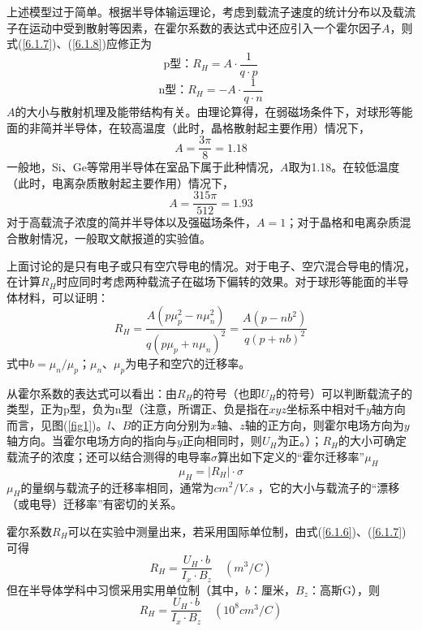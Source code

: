 \documentclass[a4paper]{article}
\begin{document}
上述模型过于简单。根据半导体输运理论，考虑到载流子速度的统计分布以及载流子在运动中受到散射等因素，在霍尔系数的表达式中还应引入一个霍尔因子$A$，则式(\ref{6.1.7})、(\ref{6.1.8})应修正为
\begin{equation}\label{6.1.9}
\text{p型：}R_H=A\cdot\frac{1}{q\cdot p}
\end{equation}
\begin{equation}\label{6.1.10}
\text{n型：}R_H=-A\cdot\frac{1}{q\cdot n}
\end{equation}
$A$的大小与散射机理及能带结构有关。由理论算得，在弱磁场条件下，对球形等能面的非简并半导体，在较高温度（此时，晶格散射起主要作用）情况下，
\begin{equation*}
A=\frac{3\pi}{8}=1.18
\end{equation*}
一般地，Si、Ge等常用半导体在室品下属于此种情况，$A$取为1.18。在较低温度（此时，电离杂质散射起主要作用）情况下，
\begin{equation*}
A=\frac{315\pi}{512}=1.93
\end{equation*}
对于高载流子浓度的简并半导体以及强磁场条件，$A=1$；对于晶格和电离杂质混合散射情况，一般取文献报道的实验值。

上面讨论的是只有电子或只有空穴导电的情况。对于电子、空穴混合导电的情况，在计算$R_H$时应同时考虑两种载流子在磁场下偏转的效果。对于球形等能面的半导体材料，可以证明：
\begin{equation}\label{6.1.11}
R_H=\frac{A(p\mu_p^2-n\mu_n^2)}{q(p\mu_p+n\mu_n)^2}=\frac{A(p-nb^2)}{q(p+nb)^2}
\end{equation}
式中$b=\mu_n/\mu_p$；$\mu_n$、$\mu_p$为电子和空穴的迁移率。

从霍尔系数的表达式可以看出：由$R_H$的符号（也即$U_H$的符号）可以判断载流子的类型，正为p型，负为n型（注意，所谓正、负是指在$xyz$坐标系中相对千$y$轴方向而言，见图(\ref{fig1})。$l$、$B$的正方向分别为$x$轴、$z$轴的正方向，则霍尔电场方向为$y$轴方向。当霍尔电场方向的指向与$y$正向相同时，则$U_H$为正。）；$R_H$的大小可确定载流子的浓度；还可以结合测得的电导率$\sigma$算出如下定义的“霍尔迁移率”$\mu_H$
\begin{equation}\label{6.1.12}
\mu_H=|R_H|\cdot \sigma
\end{equation}
$\mu_H$的量纲与载流子的迁移率相同，通常为$ \si{cm^2/V.s} $%
，它的大小与载流子的“漂移（或电导）迁移率”有密切的关系。

霍尔系数$R_H$可以在实验中测量出来，若采用国际单位制，由式(\ref{6.1.6})、(\ref{6.1.7})可得
\begin{equation}\label{6.1.13}
R_H=\frac{U_H \cdot b}{I_x \cdot B_z} \quad (\si{m^3/C})
\end{equation}
但在半导体学科中习惯采用实用单位制（其中，$b$：厘米，$B_z$：高斯G），则
\begin{equation*}
R_H=\frac{U_H \cdot b}{I_x \cdot B_z} \quad (10^8\si{cm^3/C})
\end{equation*}
\end{document}

